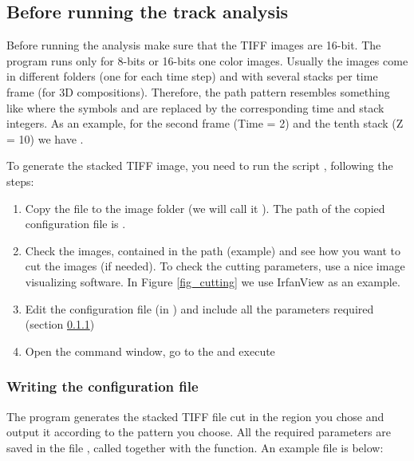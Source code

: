 \documentclass[12pt]{article}
\begin{document}
\subsection{Before running the track analysis} \label{sec_run_pre_track}

Before running the analysis make sure that the TIFF images are 16-bit. The program runs only for 8-bits or 16-bits one color images. Usually the images come in different folders (one for each time step) and with several stacks per time frame (for 3D compositions). Therefore, the path pattern resembles something like  where the symbols  and  are replaced by the corresponding time and stack integers. As an example, for the second frame (Time = 2) and the tenth stack (Z = 10) we have .

To generate the stacked TIFF image, you need to run the script , following the steps:

\begin{enumerate}
\item{Copy the file  to the image folder (we will call it ). The path of the copied configuration file is .}
\item{Check the images, contained in the path (example)  and see how you want to cut the images (if needed). To check the cutting parameters, use a nice image visualizing software. In Figure \ref{fig_cutting} we use IrfanView as an example.}
\item{Edit the configuration file (in ) and include all the parameters required (section \ref{sec_write_cut_config})}
\item{Open the command window, go to the  and execute }
\end{enumerate}

\subsubsection{Writing the configuration file} \label{sec_write_cut_config}

The program generates the stacked TIFF file cut in the region you chose and output it according to the pattern you choose. All the required parameters are saved in the file , called together with the function. An example file is below:
\end{document}
